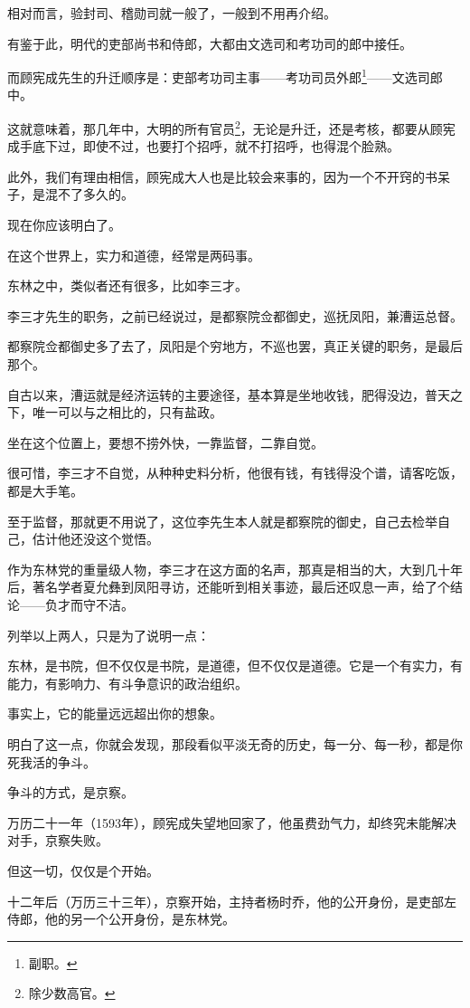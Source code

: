 \begin{multicols}{\theparacolNo}
		相对而言，验封司、稽勋司就一般了，一般到不用再介绍。

		有鉴于此，明代的吏部尚书和侍郎，大都由文选司和考功司的郎中接任。

		而顾宪成先生的升迁顺序是：吏部考功司主事——考功司员外郎\footnote{副职。}——文选司郎中。

		这就意味着，那几年中，大明的所有官员\footnote{除少数高官。}，无论是升迁，还是考核，都要从顾宪成手底下过，即使不过，也要打个招呼，就不打招呼，也得混个脸熟。

		此外，我们有理由相信，顾宪成大人也是比较会来事的，因为一个不开窍的书呆子，是混不了多久的。

		现在你应该明白了。

		在这个世界上，实力和道德，经常是两码事。

		东林之中，类似者还有很多，比如李三才。

		李三才先生的职务，之前已经说过，是都察院佥都御史，巡抚凤阳，兼漕运总督。

		都察院佥都御史多了去了，凤阳是个穷地方，不巡也罢，真正关键的职务，是最后那个。

		自古以来，漕运就是经济运转的主要途径，基本算是坐地收钱，肥得没边，普天之下，唯一可以与之相比的，只有盐政。

		坐在这个位置上，要想不捞外快，一靠监督，二靠自觉。

		很可惜，李三才不自觉，从种种史料分析，他很有钱，有钱得没个谱，请客吃饭，都是大手笔。

		至于监督，那就更不用说了，这位李先生本人就是都察院的御史，自己去检举自己，估计他还没这个觉悟。

		作为东林党的重量级人物，李三才在这方面的名声，那真是相当的大，大到几十年后，著名学者夏允彝到凤阳寻访，还能听到相关事迹，最后还叹息一声，给了个结论——负才而守不洁。

		列举以上两人，只是为了说明一点：

		东林，是书院，但不仅仅是书院，是道德，但不仅仅是道德。它是一个有实力，有能力，有影响力、有斗争意识的政治组织。

		事实上，它的能量远远超出你的想象。

		明白了这一点，你就会发现，那段看似平淡无奇的历史，每一分、每一秒，都是你死我活的争斗。

		争斗的方式，是京察。

		万历二十一年（1593年），顾宪成失望地回家了，他虽费劲气力，却终究未能解决对手，京察失败。

		但这一切，仅仅是个开始。

		十二年后（万历三十三年），京察开始，主持者杨时乔，他的公开身份，是吏部左侍郎，他的另一个公开身份，是东林党。


\end{multicols}

